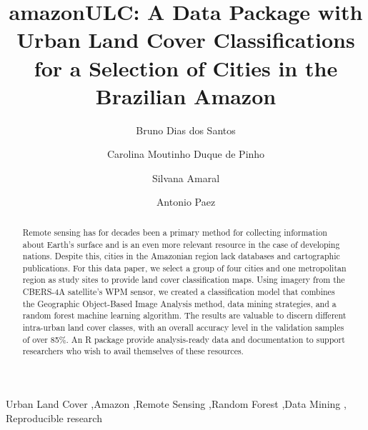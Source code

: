\documentclass[preprint, 3p,
authoryear]{elsarticle} %
\begin{document}
\begin{frontmatter}

  \title{amazonULC: A Data Package with Urban Land Cover Classifications
for a Selection of Cities in the Brazilian Amazon}
    \author[National Institute for Space Research (INPE)]{Bruno Dias dos
Santos%
  }
    \author[Federal University of ABC (UFABC)]{Carolina Moutinho Duque
de Pinho%
  }
    \author[National Institute for Space Research (INPE)]{Silvana
Amaral%
  }
    \author[McMaster University]{Antonio Paez%
  }
  
  \begin{abstract}
  Remote sensing has for decades been a primary method for collecting
  information about Earth's surface and is an even more relevant
  resource in the case of developing nations. Despite this, cities in
  the Amazonian region lack databases and cartographic publications. For
  this data paper, we select a group of four cities and one metropolitan
  region as study sites to provide land cover classification maps. Using
  imagery from the CBERS-4A satellite's WPM sensor, we created a
  classification model that combines the Geographic Object-Based Image
  Analysis method, data mining strategies, and a random forest machine
  learning algorithm. The results are valuable to discern different
  intra-urban land cover classes, with an overall accuracy level in the
  validation samples of over 85\%. An R package provide analysis-ready
  data and documentation to support researchers who wish to avail
  themselves of these resources.
  \end{abstract}
    \begin{keyword}
    Urban Land Cover \sep Amazon \sep Remote Sensing \sep Random
Forest \sep Data Mining \sep 
    Reproducible research
  \end{keyword}
  
 \end{frontmatter}
\end{document}
